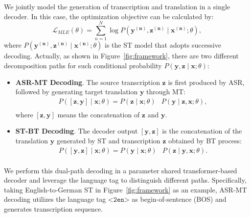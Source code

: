 \documentclass[letterpaper]{article} %
\begin{document}
We jointly model the generation of transcription and translation in a single decoder. 
In this case, the optimization objective can be calculated by:
\begin{equation}
    \mathcal{L}_{MLE}(\theta)=\sum_{n=1}^{N} \log P\left(\mathbf{y^{(n)}}, \mathbf{z^{(n)}} \mid \mathbf{x^{(n)}} ; \theta\right),
    \label{eq:loss_dual_ways_mle_1}
\end{equation}
where $P\left(\mathbf{y^{(n)}}, \mathbf{z^{(n)}} \mid \mathbf{x^{(n)}} ; \theta\right)$ is the ST model that adopts successive decoding. 
Actually, as shown in Figure~\ref{fig:framework}, there are two different decomposition paths for such conditional probability $P\left(\mathbf{y}, \mathbf{z} \mid \mathbf{x} ; \theta\right)$:
\begin{itemize}
    \item  \textbf{ASR-MT Decoding}. The source transcription $\mathbf{z}$ is first produced by ASR, followed by generating target translation $\mathbf{y}$ through MT:
    \begin{equation}
        \begin{aligned}
            P\left([\mathbf{z},\mathbf{y}] \mid \mathbf{x} ; \theta\right)= P\left( \mathbf{z} \mid \mathbf{x} ; \theta\right) & P\left( \mathbf{y} \mid \mathbf{z}, \mathbf{x} ; \theta\right), \\
        \end{aligned}
        \label{eq:asr_mt_prob}
    \end{equation}
    where $[\mathbf{z},\mathbf{y}]$ means the concatenation of $\mathbf{z}$ and $\mathbf{y}$.
    \item \textbf{ST-BT Decoding}. The decoder output $[\mathbf{y},\mathbf{z}]$ is the concatenation of the translation $\mathbf{y}$ generated by ST and transcription $\mathbf{z}$ obtained by BT process:
    \begin{equation}
        \begin{aligned}
            P\left([\mathbf{y},\mathbf{z}]\mid \mathbf{x} ; \theta\right) =  P\left( \mathbf{y} \mid \mathbf{x} ; \theta\right) & P\left( \mathbf{z} \mid \mathbf{y}, \mathbf{x} ; \theta\right). \\
        \end{aligned}
        \label{eq:st_bt_prob}
    \end{equation}
\end{itemize}
We perform this dual-path decoding in a parameter shared transformer-based decoder and leverage the language tag to distinguish different paths.
Specifically, taking English-to-German ST in Figure~\ref{fig:framework} as an example, ASR-MT decoding utilizes the language tag $\texttt{<2en>}$ as begin-of-sentence (BOS) and generates transcription sequence. 
\end{document}
